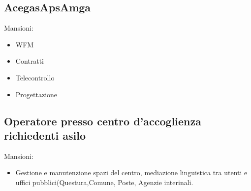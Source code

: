 \documentclass[12pt,a4paper,sans]{moderncv} %
\begin{document}
\subsection{AcegasApsAmga}
Mansioni:
\begin{itemize}
\item WFM
\item Contratti
\item Telecontrollo
\item Progettazione

\end{itemize}

\subsection{Operatore presso centro d'accoglienza richiedenti asilo}

Mansioni:
\begin{itemize}
\item Gestione e manutenzione spazi del centro, mediazione linguistica tra utenti e uffici pubblici(Questura,Comune, Poste, Agenzie interinali.
\end{itemize}
\end{document}
